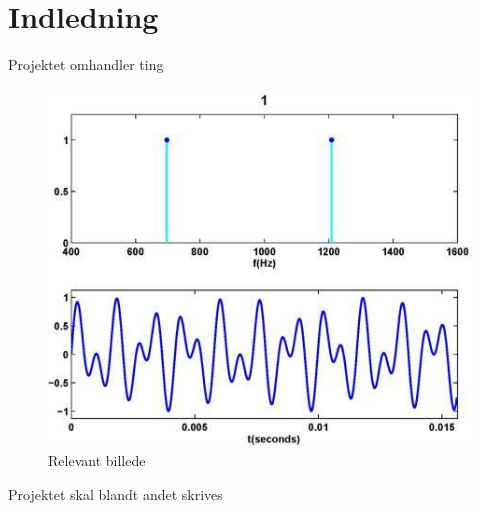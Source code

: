 \section{Indledning}
Projektet omhandler ting

\begin{figure}[h]
\centering
\includegraphics[scale=0.5]{Billeder/DTMF1.jpg}
\caption{Relevant billede}
\label{fig:DTMF1}
\end{figure}

Projektet skal blandt andet skrives 